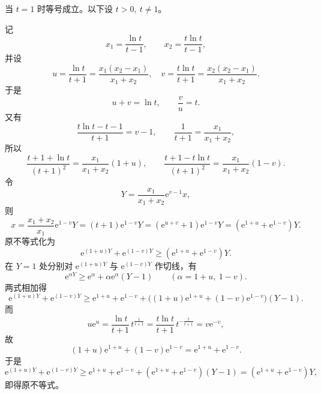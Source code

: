 \begin{solution}
当 $t=1$ 时等号成立。以下设 $t>0,\ t\neq1$。

记
\[
x_1 = \frac{\ln t}{t-1},\qquad x_2 = \frac{t\ln t}{t-1},
\]
并设
\[
u = \frac{\ln t}{t+1}=\frac{x_1(x_2-x_1)}{x_1+x_2}, \quad v = \frac{t\ln t}{t+1}=\frac{x_2(x_2-x_1)}{x_1+x_2}.
\]
于是
\[
u+v=\ln t,\qquad \frac vu=t.
\]
又有
\[
\frac{t\ln t-t-1}{t+1}=v-1,\qquad \frac1{t+1}=\frac{x_1}{x_1+x_2},
\]
所以
\[
\frac{t+1+\ln t}{(t+1)^2} = \frac{x_1}{x_1+x_2}(1+u),\qquad
\frac{t+1-t\ln t}{(t+1)^2} = \frac{x_1}{x_1+x_2}(1-v).
\]
令
\[
Y=\frac{x_1}{x_1+x_2}\mathrm e^{v-1}x,
\]
则
\[
x = \frac{x_1+x_2}{x_1}\mathrm e^{1-v}Y
= (t+1)\mathrm e^{1-v}Y
= (\mathrm e^{u+v}+1)\mathrm e^{1-v}Y
= (\mathrm e^{1+u}+\mathrm e^{1-v})Y.
\]
原不等式化为
\[
\mathrm{e}^{(1+u)Y} + \mathrm{e}^{(1-v)Y} \geqslant  (\mathrm{e}^{1+u} + \mathrm{e}^{1-v})Y.
\]
在 $Y=1$ 处分别对 $\mathrm e^{(1+u)Y}$ 与 $\mathrm e^{(1-v)Y}$ 作切线，有
\[
\mathrm e^{\alpha Y}\ge \mathrm e^\alpha+\alpha \mathrm e^\alpha(Y-1)\qquad (\alpha=1+u,\ 1-v).
\]
两式相加得
\[
\mathrm e^{(1+u)Y}+\mathrm e^{(1-v)Y}
\ge \mathrm e^{1+u}+\mathrm e^{1-v}+\bigl((1+u)\mathrm e^{1+u}+(1-v)\mathrm e^{1-v}\bigr)(Y-1).
\]
而
\[
u\mathrm e^u=\frac{\ln t}{t+1}\,t^{\frac1{t+1}}
=\frac{t\ln t}{t+1}\,t^{-\frac t{t+1}}=v\mathrm e^{-v},
\]
故
\[
(1+u)\mathrm e^{1+u}+(1-v)\mathrm e^{1-v}=\mathrm e^{1+u}+\mathrm e^{1-v}.
\]
于是
\[
\mathrm e^{(1+u)Y}+\mathrm e^{(1-v)Y}\ge \mathrm e^{1+u}+\mathrm e^{1-v}+(\mathrm e^{1+u}+\mathrm e^{1-v})(Y-1)
=(\mathrm e^{1+u}+\mathrm e^{1-v})Y,
\]
即得原不等式。
\end{solution}


